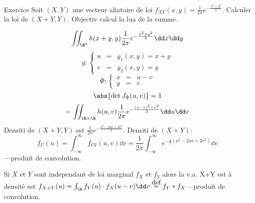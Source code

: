 Exercice
Soit $(X,Y)$ une vecteur aliatoire de loi $f_{XY}(x,y)=\frac 1{2\pi}e^{-\frac{x^2+y^2}2}$. Calculer la loi de $(X+Y,Y)$.
Objectiv calcul la lua de la summe.

$$\iint_{\R^2}h(x+y, y)\frac 1{2\pi}e^{-\frac{x^2+y^2}2}\dd x\dd y$$
$$g: \left\{ \begin{array}{ccc}u&=&g_1(x,y)=x+y\\v&=&g_2(x,y)=y\end{array} \right.$$
$$\Phi: \left\{ \begin{array}{ccc}x&=&u-v\\y&=&v\end{array} \right.$$
$$\abs{\det J_\Phi (u,v)}=1$$
$$=\iint_{\R\times\R}h(u,v)\frac{1}{2\pi}e^{-\frac{(u-v)^2+v^2}{2}}\dd u\dd v$$
Densiti de $(X+Y,Y)$ est $\frac{1}{2\pi}e^{-\frac{u^2-2uv+2v^2}{2}}$.
Densiti de $(X+Y)$:
$$f_U(u)=\int_{-\infty}^\infty f_{UV}(u,v)\dd v=\frac 1{2\pi}\int_{-\infty}^\infty e^{-\frac 12(u^2-2uv+2v^2)}\dd v$$
---produit de convolution.

Si $X$ et $Y$ sont independant de loi marginal $f_X$ et $f_Y$ alors la v.a. X+Y est à densitè est $f_{X+Y}(u)=\int_\R f_Y(u)\cdot f_X(u-v)\dd v\overset{\mbox{def}}{=}f_Y\ast f_X$---produit de convolution.
